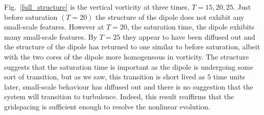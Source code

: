 Fig.~\ref{full_structure} is the vertical vorticity at three times, $T=15,20,25$. Just before saturation $(T=20)$ the structure of the dipole does not exhibit any small-scale features. However at $T=20$, the saturation time, the dipole exhibits many small-scale features. By $T=25$ they appear to have been diffused out and the structure of the dipole has returned to one similar to before saturation, albeit with the two cores of the dipole more homogeneous in vorticity. The structure suggests that the saturation time is important as the dipole is undergoing some sort of transition, but as we saw, this transition is short lived as $5$ time units later, small-scale behaviour has diffused out and there is no suggestion that the system will transition to turbulence. Indeed, this result reaffirms that the gridspacing is sufficient enough to resolve the nonlinear evolution. 

